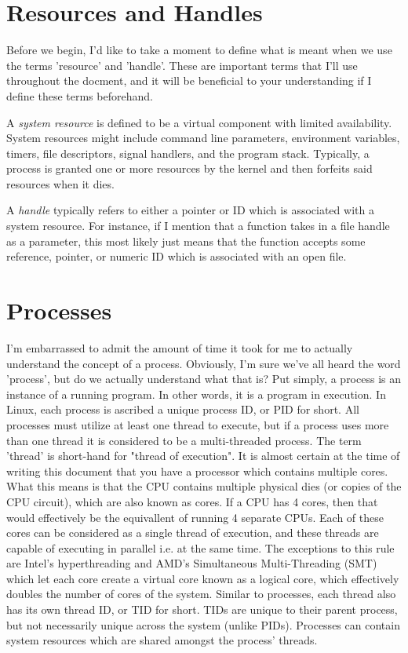 \documentclass{article}
\begin{document}
\section{Resources and Handles}

Before we begin, I'd like to take a moment to define what is meant when we use the terms 'resource' and
'handle'. These are important terms that I'll use throughout the docment, and it will be beneficial to your
understanding if I define these terms beforehand.

A \textit{system resource} is defined to be a virtual component with limited availability. System resources
might include command line parameters, environment variables, timers, file descriptors, signal handlers, and
the program stack. Typically, a process is granted one or more resources by the kernel and then forfeits said
resources when it dies.

A \textit{handle} typically refers to either a pointer or ID which is associated with a system resource. For
instance, if I mention that a function takes in a file handle as a parameter, this most likely just means that
the function accepts some reference, pointer, or numeric ID which is associated with an open file.

\section{Processes}

I'm embarrassed to admit the amount of time it took for me to actually understand the concept of a process.
Obviously, I’m sure we’ve all heard the word 'process', but do we actually understand what that is? Put simply,
a process is an instance of a running program. In other words, it is a program in execution. In Linux, each
process is ascribed a unique process ID, or PID for short. All processes must utilize at least one thread to
execute, but if a process uses more than one thread it is considered to be a multi-threaded process. The term
'thread' is short-hand for "thread of execution". It is almost certain at the time of writing this document
that you have a processor which contains multiple cores. What this means is that the CPU contains multiple
physical dies (or copies of the CPU circuit), which are also known as cores. If a CPU has 4 cores, then
that would effectively be the equivallent of running 4 separate CPUs. Each of these cores can be considered
as a single thread of execution, and these threads are capable of executing in parallel i.e. at the same time.
The exceptions to this rule are Intel’s hyperthreading and AMD’s Simultaneous Multi-Threading (SMT) which
let each core create a virtual core known as a logical core, which effectively doubles the number of cores of
the system. Similar to processes, each thread also has its own thread ID, or TID for short. TIDs are unique
to their parent process, but not necessarily unique across the system (unlike PIDs). Processes can contain
system resources which are shared amongst the process' threads.
\end{document}
